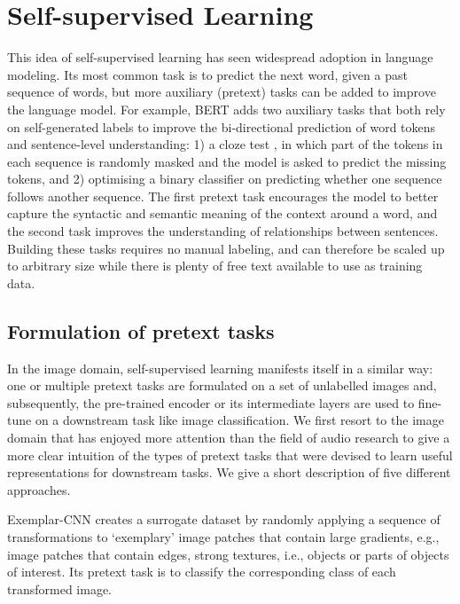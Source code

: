 \section{Self-supervised Learning}\label{sec:self_supervised_learning}
This idea of self-supervised learning has seen widespread adoption in language modeling.
Its most common task is to predict the next word, given a past sequence of words, but more auxiliary (pretext) tasks can be added to improve the language model.
For example, BERT \cite{Devlin2019BERTPO} adds two auxiliary tasks that both rely on self-generated labels to improve the bi-directional prediction of word tokens and sentence-level understanding: 1) a cloze test \cite{doi:10.1177/107769905303000401}, in which part of the tokens in each sequence is randomly masked and the model is asked to predict the missing tokens, and 2) optimising a binary classifier on predicting whether one sequence follows another sequence.
The first pretext task encourages the model to better capture the syntactic and semantic meaning of the context around a word, and the second task improves the understanding of relationships between sentences.
Building these tasks requires no manual labeling, and can therefore be scaled up to arbitrary size while there is plenty of free text available to use as training data.

\newpage

\subsection{Formulation of pretext tasks}
In the image domain, self-supervised learning manifests itself in a similar way: one or multiple pretext tasks are formulated on a set of unlabelled images and, subsequently, the pre-trained encoder or its intermediate layers are used to fine-tune on a downstream task like image classification.
We first resort to the image domain that has enjoyed more attention than the field of audio research to give a more clear intuition of the types of pretext tasks that were devised to learn useful representations for downstream tasks.
We give a short description of five different approaches.

Exemplar-CNN \cite{dosovitskiy_discriminative_2014} creates a surrogate dataset by randomly applying a sequence of transformations to `exemplary' image patches that contain large gradients, e.g., image patches that contain edges, strong textures, i.e., objects or parts of objects of interest.
Its pretext task is to classify the corresponding class of each transformed image.

